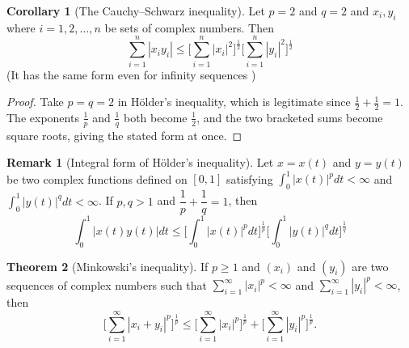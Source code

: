 \documentclass[11pt,a4paper]{article}
\theoremstyle{definition}
\newtheorem{thm}{Theorem}[section]
\newtheorem{coro}[thm]{Corollary}
\newtheorem*{remark}{Remark}
\begin{document}
\begin{coro}[The Cauchy--Schwarz inequality]
Let $p=2$ and $q=2$ and $x_i,y_i$ where $i=1,2,\dots,n$ be sets of complex numbers. Then $$\sum^n_{i=1}|x_iy_i|\leq \Bigg[\sum^n_{i=1}|x_i|^2\Bigg]^{\frac{1}{2}} \Bigg[\sum^n_{i=1}|y_i|^2\Bigg]^{\frac{1}{2}}$$ (It has the same form even for infinity sequences )

\end{coro}

\begin{proof}
Take $p=q=2$ in H\"older's inequality, which is legitimate since
$\frac12+\frac12=1$. The exponents $\frac1p$ and $\frac1q$ both become
$\frac12$, and the two bracketed sums become square roots, giving the stated
form at once.
\end{proof}

\begin{remark}[Integral form of H\"older's inequality]
Let $x=x(t)$ and $y=y(t)$ be two complex functions defined on $[0,1]$ satisfying $\displaystyle{\int^1_0|x(t)|^pdt<\infty}$ and $\displaystyle{\int^1_0|y(t)|^qdt<\infty}$. If $p,q>1$ and $\dfrac{1}{p}+\dfrac{1}{q}=1$, then $$\int^1_0|x(t)y(t)|dt\leq \Bigg[\int^1_0|x(t)|^pdt\Bigg]^{\frac{1}{p}}\Bigg[\int^1_0|y(t)|^qdt\Bigg]^{\frac{1}{q}}$$


\end{remark}

\begin{thm}[Minkowski's inequality]
If $p\geq 1$ and $(x_i)$ and $(y_i)$ are two sequences of complex numbers such that $\sum\limits^{\infty}_{i=1}|x_i|^p<\infty$ and $\sum\limits^{\infty}_{i=1}|y_i|^p<\infty$, then $$\Bigg[\sum^{\infty}_{i=1}|x_i+y_i|^p\Bigg]^{\frac{1}{p}}\leq \Bigg[\sum^{\infty}_{i=1}|x_i|^p\Bigg]^{\frac{1}{p}}+\Bigg[\sum^{\infty}_{i=1}|y_i|^p\Bigg]^{\frac{1}{p}}.$$

\end{thm}
\end{document}
